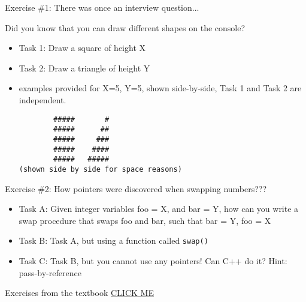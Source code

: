     
\begin{frame}[fragile]{Exercise \#1: There was once an interview question...}

Did you know that you can draw different shapes on the console?

    \begin{itemize}
        \item Task 1: Draw a square of height X
        \item Task 2: Draw a triangle of height Y
        \item examples provided for X=5, Y=5, shown side-by-side, Task 1 and Task 2 are independent.    %
        \begin{lstlisting}
        #####       #
        #####      ##
        #####     ###
        #####    ####
        #####   #####
(shown side by side for space reasons) \end{lstlisting}
    \end{itemize}      


\end{frame}

\begin{frame}{Exercise \#2: How pointers were discovered when swapping numbers???}

    \begin{itemize}
        \item Task A: Given integer variables foo = X, and bar = Y, how can you write a swap procedure that swaps foo and bar, such that bar = Y, foo = X
    
        \item Task B: Task A, but using a function called \texttt{swap()}
    
        \item Task C: Task B, but you cannot use any pointers! Can C++ do it?
        Hint: pass-by-reference
    \end{itemize}      
\end{frame}

\begin{frame}{Exercises from the textbook}
    \href{https://learningcpp.org/chapters/chapter01-basics/exercises}{CLICK ME}
\end{frame}

